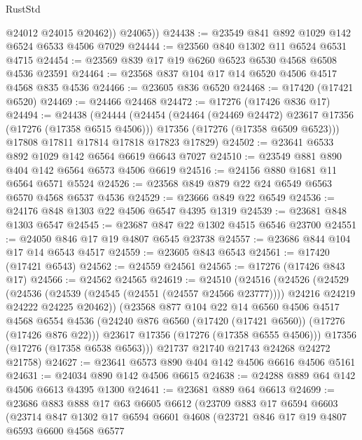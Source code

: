 \begin{lexlean}{RustStd}
\begin{coremodule}
            @24012
            @24015
            @20462))
        @24065))
@24438 := @23549 @841 @892 @1029 @142 @6524 @6533 @4506 @7029
@24444 := @23560 @840 @1302 @11 @6524 @6531 @4715
@24454 := @23569 @839 @17 @19 @6260 @6523 @6530 @4568 @6508 @4536 @23591
@24464 := @23568 @837 @104 @17 @14 @6520 @4506 @4517 @4568 @835 @4536
@24466 := @23605 @836 @6520
@24468 := @17420 (@17421 @6520)
@24469 := @24466 @24468
@24472 := @17276 (@17426 @836 @17)
@24494 := @24438
    (@24444
      (@24454
        (@24464 (@24469 @24472) @23617 @17356 (@17276 (@17358 @6515 @4506)))
        @17356
        (@17276 (@17358 @6509 @6523)))
      @17808
      @17811
      @17814
      @17818
      @17823
      @17829)
@24502 := @23641 @6533 @892 @1029 @142 @6564 @6619 @6643 @7027
@24510 := @23549 @881 @890 @404 @142 @6564 @6573 @4506 @6619
@24516 := @24156 @880 @1681 @11 @6564 @6571 @5524
@24526 := @23568 @849 @879 @22 @24 @6549 @6563 @6570 @4568 @6537 @4536
@24529 := @23666 @849 @22 @6549
@24536 := @24176 @848 @1303 @22 @4506 @6547 @4395 @1319
@24539 := @23681 @848 @1303 @6547
@24545 := @23687 @847 @22 @1302 @4515 @6546 @23700
@24551 := @24050 @846 @17 @19 @4807 @6545 @23738
@24557 := @23686 @844 @104 @17 @14 @6543 @4517
@24559 := @23605 @843 @6543
@24561 := @17420 (@17421 @6543)
@24562 := @24559 @24561
@24565 := @17276 (@17426 @843 @17)
@24566 := @24562 @24565
@24619 := @24510
    (@24516
      (@24526
        (@24529
          (@24536
            (@24539 (@24545 (@24551 (@24557 @24566 @23777))))
            @24216
            @24219
            @24222
            @24225
            @20462))
        (@23568
          @877
          @104
          @22
          @14
          @6560
          @4506
          @4517
          @4568
          @6554
          @4536
          (@24240 @876 @6560 (@17420 (@17421 @6560)) (@17276 (@17426 @876 @22)))
          @23617
          @17356
          (@17276 (@17358 @6555 @4506)))
        @17356
        (@17276 (@17358 @6538 @6563)))
      @21737
      @21740
      @21743
      @24268
      @24272
      @21758)
@24627 := @23641 @6573 @890 @404 @142 @4506 @6616 @4506 @5161
@24631 := @24034 @890 @142 @4506 @6615
@24638 := @24288 @889 @64 @142 @4506 @6613 @4395 @1300
@24641 := @23681 @889 @64 @6613
@24699 := @23686
    @883
    @888
    @17
    @63
    @6605
    @6612
    (@23709
      @883
      @17
      @6594
      @6603
      (@23714
        @847
        @1302
        @17
        @6594
        @6601
        @4608
        (@23721
          @846
          @17
          @19
          @4807
          @6593
          @6600
          @4568
          @6577

\end{coremodule}
\end{lexlean}
